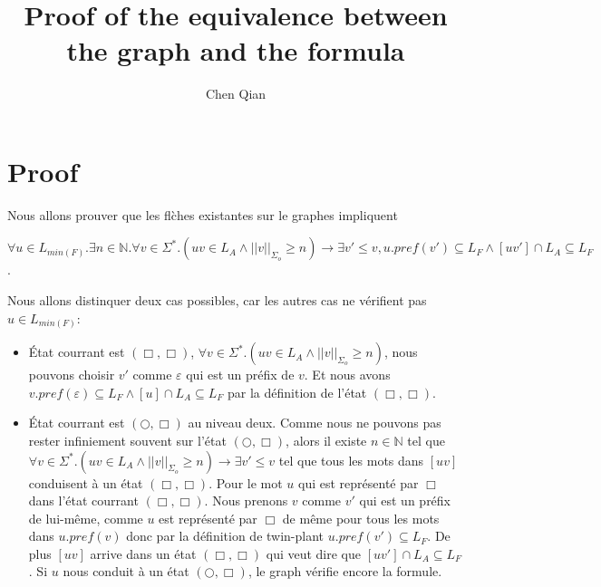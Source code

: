 \documentclass[a4paper,10pt]{article}
\title{Proof of the equivalence between the graph and the formula}
\author{Chen Qian}
\begin{document}
\maketitle

\section{Proof}

Nous allons prouver que les fl\`ches existantes sur le graphes impliquent

$$\forall u \in L_{min(F)}. \exists n \in \mathbb{N}. \forall v \in \Sigma^*.(uv \in L_A \wedge ||v||_{\Sigma_o}\geq n) \to \exists v'\leq v, u.pref(v') \subseteq L_F \wedge [uv'] \cap L_A \subseteq L_F$$.

Nous allons distinquer deux cas possibles, car les autres cas ne v\'erifient pas $u \in L_{min(F)}$:
\begin{itemize}
\item \'Etat courrant est $(\Box, \Box)$, $\forall v \in \Sigma^*.(uv \in L_A \wedge ||v||_{\Sigma_o}\geq n)$, nous pouvons choisir $v'$ comme $\varepsilon$ qui est un pr\'efix de $v$. Et nous avons $v.pref(\varepsilon) \subseteq L_F \wedge [u] \cap L_A \subseteq L_F$ par la d\'efinition de l'\'etat $(\Box, \Box)$.
\item \'Etat courrant est $(\bigcirc,\Box)$ au niveau deux. Comme nous ne pouvons pas rester infiniement souvent sur l'\'etat $(\bigcirc,\Box)$, alors il existe $n \in \mathbb{N}$ tel que $ \forall v \in \Sigma^*.(uv \in L_A \wedge ||v||_{\Sigma_o}\geq n) \to \exists v'\leq v$ tel que tous les mots dans $[uv]$ conduisent \`a un \'etat $(\Box,\Box)$. Pour le mot $u$ qui est repr\'esent\'e par $\Box$ dans l'\'etat courrant $(\Box,\Box)$. Nous prenons $v$ comme $v'$ qui est un pr\'efix de lui-m\^eme, comme $u$ est repr\'esent\'e par $\Box$ de m\^eme pour tous les mots dans $u.pref(v)$ donc par la d\'efinition de twin-plant $u.pref(v') \subseteq L_F$. De plus $[uv]$ arrive dans un \'etat $(\Box,\Box)$ qui veut dire que $[uv'] \cap L_A \subseteq L_F$. Si $u$ nous conduit \`a un \'etat $(\bigcirc,\Box)$, le graph v\'erifie encore la formule.
\end{itemize}
\end{document}
